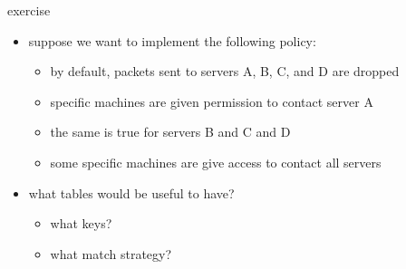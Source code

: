 \begin{frame}{exercise}
    \begin{itemize}
    \item suppose we want to implement the following policy:
        \begin{itemize}
        \item by default, packets sent to servers A, B, C, and D are dropped
        \item specific machines are given permission to contact server A
        \item the same is true for servers B and C and D
        \item some specific machines are give access to contact all servers
        \end{itemize}
    \item what tables would be useful to have?
        \begin{itemize}
        \item what keys?
        \item what match strategy?
        \end{itemize}
    \end{itemize}
\end{frame}
